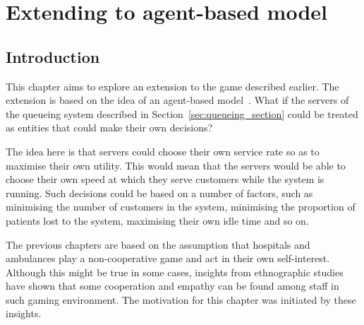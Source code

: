 \chapter{Extending to agent-based model}\label{sec:agent_based_extension}

\section{Introduction}

This chapter aims to explore an extension to the game described earlier.
The extension is based on the idea of an agent-based
model~\cite{de2014agent, fetta2012peter, knight2012modelling}.
What if the servers of the queueing system described in
Section~\ref{sec:queueing_section} could be treated as entities that could make
their own decisions?

The idea here is that servers could choose their own service rate so as to
maximise their own utility.
This would mean that the servers would be able to choose their own speed at
which they serve customers while the system is running.
Such decisions could be based on a number of factors, such as minimising the
number of customers in the system, minimising the proportion of patients lost
to the system, maximising their own idle time and so on.

The previous chapters are based on the assumption that hospitals and ambulances
play a non-cooperative game and act in their own self-interest.
Although this might be true in some cases, insights from ethnographic
studies~\cite{allen2004understanding} have shown that some cooperation and
empathy can be found among staff in such gaming environment.
The motivation for this chapter was initiated by these insights.

